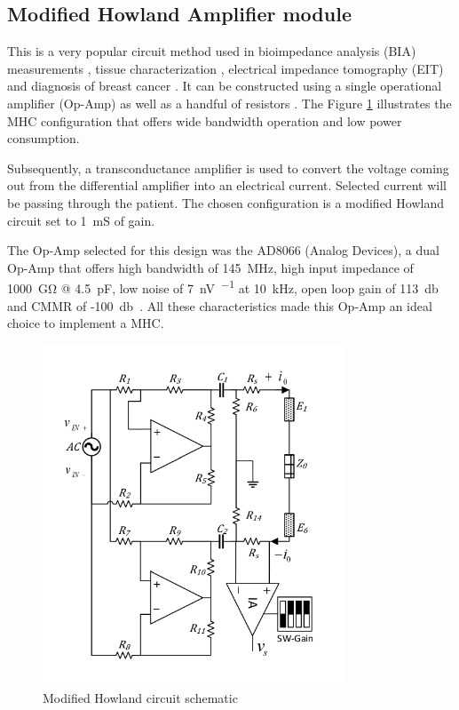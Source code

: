 \subsection{Modified Howland Amplifier module}
\label{section MHC}
This is a very popular circuit method used in bioimpedance analysis (BIA) measurements \cite{aroom2009bioimpedance}, tissue characterization \cite{bertemes2002tissue,ross2003current}, electrical impedance tomography (EIT) and diagnosis of breast cancer \cite{zou2003review,saulnier2007electrical}. It can be constructed using a single operational amplifier (Op-Amp) as well as a handful of resistors \cite{sheingold1964impedance}. The Figure \ref{fig:mhc} illustrates the MHC configuration that offers wide bandwidth operation and low power consumption. 

Subsequently, a transconductance amplifier is used to convert the voltage coming out from the differential amplifier into an electrical current. Selected current will be passing through the patient. The chosen configuration is a modified Howland circuit set to \SI{1}{\milli\siemens} of gain.

The Op-Amp selected for this design was the AD8066 (Analog Devices), a dual Op-Amp that offers high bandwidth of \SI{145}{\mega\hertz}, high input impedance of \SI{1000}{\giga\ohm} @ \SI{4.5}{\pF}, low noise of \SI{7}{\nano\volt\per{}} at \SI{10}{\kilo\hertz}, open loop gain of \SI{113}{\decibel} and CMMR of -\SI{100}{\decibel}~\cite{ad:AD8066}. All these characteristics made this Op-Amp an ideal choice to implement a MHC.

\begin{figure}[!htpb]
	\centering
	\includegraphics[width=9cm,keepaspectratio]{figure3}  
	\caption{Modified Howland circuit schematic}
	\label{fig:mhc}
\end{figure}

